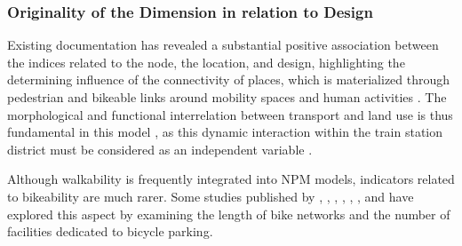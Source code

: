 \begin{refsegment}
\subsubsection*{Originality of the Dimension in relation to Design
    \label{chap6:indicateurs-accessibility-originalite}
    }

Existing documentation has revealed a substantial positive association between the indices related to the node, the location, and design, highlighting the determining influence of the connectivity of places, which is materialized through pedestrian and bikeable links around mobility spaces and human activities \textcolor{blue}{\autocite[4-5]{zhang_make_2023}}. The morphological and functional interrelation between transport and land use is thus fundamental in this model \textcolor{blue}{\autocite[271]{li_transit_2019}}, as this dynamic interaction within the train station district must be considered as an independent variable \textcolor{blue}{\autocite[20]{peek_gaining_2006}}.

Although walkability is frequently integrated into \acrshort{NPM} models, indicators related to bikeability are much rarer. Some studies published by \textcolor{blue}{\textcite[195]{reusser_classifying_2008}}, \textcolor{blue}{\textcite[26]{lukman_development_2014}}, \textcolor{blue}{\textcite[312]{huang_measuring_2018}}, \textcolor{blue}{\textcite[1018]{maheshwari_evaluating_2022}}, \textcolor{blue}{\textcite[10]{arliani_measuring_2023}}, \textcolor{blue}{\textcite[6]{zhang_make_2023}}, and \textcolor{blue}{\textcite[82]{robillard_transit-oriented_2024}} have explored this aspect by examining the length of bike networks and the number of facilities dedicated to bicycle parking.


\end{refsegment}

